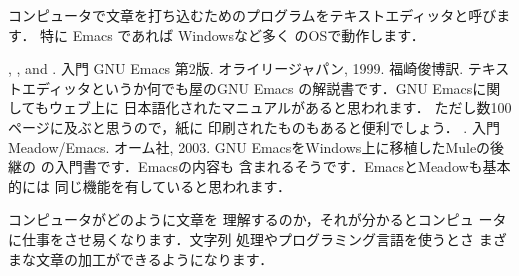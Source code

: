 コンピュータで文章を打ち込むためのプログラムをテキストエディッタと呼びま
す．%
特に Emacs であれば Windowsなど多く
のOSで動作します．
\begin{myreferences}
, , 
  and . \newblock
 入門 GNU Emacs 第2版.
 オライリージャパン, 1999.
 福崎俊博訳.
\sanko
テキストエディッタというか何でも屋のGNU Emacs
の解説書です．GNU Emacsに関してもウェブ上に
日本語化されたマニュアルがあると思われます．
ただし数100ページに及ぶと思うので，紙に
印刷されたものもあると便利でしょう．
%
. \newblock
入門 Meadow/Emacs.
オーム社, 2003.
\sanko
GNU EmacsをWindows上に移植したMuleの後継の
の入門書です．Emacsの内容も
含まれるそうです．EmacsとMeadowも基本的には
同じ機能を有していると思われます．
\end{myreferences}
%
コンピュータがどのように文章を
理解するのか，それが分かるとコンピュ
ータに仕事をさせ易くなります．文字列
処理やプログラミング言語を使うとさ
まざまな文章の加工ができるようになります．
